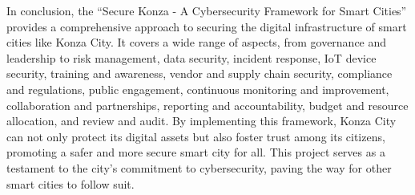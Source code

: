 \documentclass{article}
\begin{document}
In conclusion, the “Secure Konza - A Cybersecurity Framework for Smart Cities” provides a comprehensive approach to securing the digital infrastructure of smart cities like Konza City. It covers a wide range of aspects, from governance and leadership to risk management, data security, incident response, IoT device security, training and awareness, vendor and supply chain security, compliance and regulations, public engagement, continuous monitoring and improvement, collaboration and partnerships, reporting and accountability, budget and resource allocation, and review and audit.
By implementing this framework, Konza City can not only protect its digital assets but also foster trust among its citizens, promoting a safer and more secure smart city for all. This project serves as a testament to the city’s commitment to cybersecurity, paving the way for other smart cities to follow suit.

\printbibliography 
\end{document}
